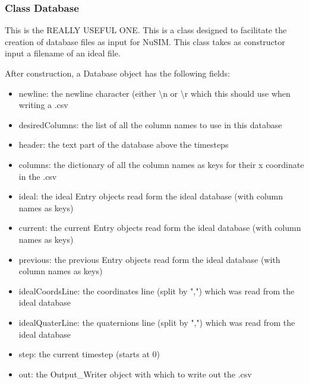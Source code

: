 \subsubsection{Class Database}
	This is the REALLY USEFUL ONE. This is a class designed to facilitate the creation of 
	database files as input for NuSIM. This class takes as 
	constructor input a filename of an ideal file.

	After construction, a Database object has the following fields:
	
\begin{itemize}
\item 	newline:	 the newline character (either \textbackslash n or \textbackslash  r
				which this should use when writing a .csv
\item		desiredColumns:	the list of all the column names to use in
				this database
\item		header:		the text part of the database above the 
				timesteps
\item		columns:	the dictionary of all the column names as 
				keys for their x coordinate in the .csv
\item		ideal:		the ideal Entry objects read form the ideal 
				database (with column names as keys)
\item		current:	the current Entry objects read form the 
				ideal database (with column names as keys)
\item		previous:	the previous Entry objects read form the 
				ideal database (with column names as keys)
\item		idealCoordsLine:	the coordinates line (split by ",") 
					which was read from the ideal 
					database
\item		idealQuaterLine:	the quaternions line (split by ",") 
					which was read from the ideal 	
					database
\item		step:		the current timestep (starts at 0)
\item		out:		the Output\_Writer object with which to 
				write out the .csv
\end{itemize}


